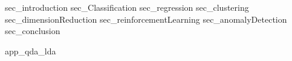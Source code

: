 \documentclass[12pt, a4paper]{article}
\begin{document}
\maketitle
\newpage
\tableofcontents
\newpage
\listoftables
\newpage
\listoffigures
{sec_introduction}
{sec_Classification}
{sec_regression}
{sec_clustering}
{sec_dimensionReduction}
{sec_reinforcementLearning}
{sec_anomalyDetection}
{sec_conclusion}
\newpage


\appendix
{app_qda_lda}
\end{document}
